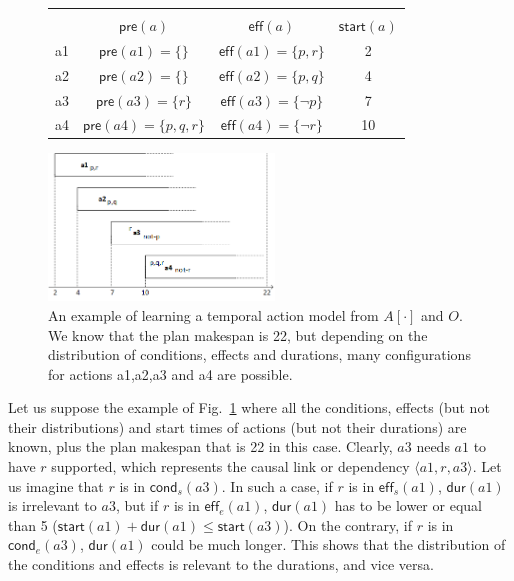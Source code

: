 \documentclass[runningheads]{llncs}
\newcommand{\tup}[1]{{\langle #1 \rangle}}
\newcommand{\pre}{\mathsf{pre}}    %
\newcommand{\eff}{\mathsf{eff}}    %
\newcommand{\cond}{\mathsf{cond}}  %
\newcommand{\dur}{\mathsf{dur}}    %
\newcommand{\start}{\mathsf{start}}%
\begin{document}
\begin{figure}
  \begin{small}
    \begin{tabular}{c| c| c| c}
\vspace{-4cm}\\
   &$\pre(a)$ &$\eff(a)$&$\start(a)$ \\\hline
a1 &$\pre(a1)=\{\}$ &$\eff(a1)=\{p,r\}$&2 \\
a2 &$\pre(a2)=\{\}$ &$\eff(a2)=\{p,q\}$&4 \\
a3 &$\pre(a3)=\{r\}$ &$\eff(a3)=\{\neg p\}$&7 \\
a4 &$\pre(a4)=\{p,q,r\}$ &$\eff(a4)=\{\neg r\}$&10 \\    
  \end{tabular}
  \end{small}    
\includegraphics[width=6cm]{ejemploacciones.png}
\caption{\small An example of learning a temporal action model from $A[\cdot]$ and $O$. We know that the plan makespan is 22, but depending on the distribution of conditions, effects and durations, many configurations for actions a1,a2,a3 and a4 are possible.}
\label{fig:exampleplantrace}
\end{figure}


Let us suppose the example of Fig.~\ref{fig:exampleplantrace} where all the conditions, effects (but not their distributions) and start times of actions (but not their durations) are known, plus the plan makespan that is 22 in this case. Clearly, $a3$ needs $a1$ to have $r$ supported, which represents the causal link or dependency $\tup{a1,r,a3}$. Let us imagine that $r$ is in $\cond_s(a3)$. In such a case, if $r$ is in $\eff_s(a1)$, $\dur(a1)$ is irrelevant to $a3$, but if $r$ is in $\eff_e(a1)$, $\dur(a1)$ has to be lower or equal than 5 ($\start(a1)+\dur(a1) \leq \start(a3)$). On the contrary, if $r$ is in $\cond_e(a3)$, $\dur(a1)$ could be much longer. This shows that the distribution of the conditions and effects is relevant to the durations, and vice versa.
\end{document}
